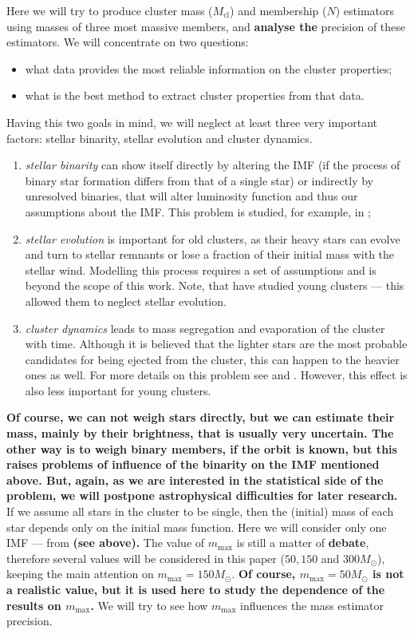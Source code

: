 \documentclass{aastex}
\newcommand{\MSun}{M_\odot}
\newcommand{\Mmax}{m_{\mathrm{max}}}
\newcommand{\Mcl}{M_{\mathrm{cl}}}
\begin{document}
Here we will try to produce cluster mass ($\Mcl$) and membership ($N$) estimators using masses of three most massive members,
and \textbf{analyse the} precision of these estimators. We will concentrate on two questions: 
\begin{itemize}
 \item what data provides the most reliable information on the cluster properties;
 \item what is the best method to extract cluster properties from that data.
\end{itemize}

Having this two goals in mind, we will neglect at least three very important factors: stellar binarity, stellar evolution and cluster dynamics.
\begin{enumerate}
 \item \textit{stellar binarity} can show itself directly by altering the IMF (if the process of binary star formation differs from that of a single star) or indirectly by unresolved binaries, that will alter luminosity function and thus our assumptions about the IMF. 
This problem is studied, for example, in \citet{WKM2008};
 \item \textit{stellar evolution} is important for old clusters, as their heavy stars can evolve and turn to stellar remnants or lose a fraction of their initial mass with the stellar wind. Modelling this process requires a set of assumptions and is beyond the scope of this work. Note, that \citet{Kroupa2010} have studied young clusters --- this allowed them to neglect stellar evolution.
 \item \textit{cluster dynamics} leads to mass segregation and evaporation of the cluster with time. Although it is believed that the lighter
stars are the most probable candidates for being ejected from the cluster, this can happen to the heavier ones as well. For more 
details on this problem see \citet{Pflamm} and \citet{Fleck}. However, this effect is also less important for young clusters.
\end{enumerate}
\textbf{
Of course, we can not weigh stars directly, but we can estimate their mass, mainly by their brightness, that is usually very uncertain. The other way is to weigh binary members, if the orbit is known, but this raises problems of influence of the binarity
on the IMF mentioned above. But, again, as we are interested in the statistical side of the problem, we will postpone astrophysical
difficulties for later research. 
}
If we assume all stars in the cluster to be single, then the (initial) mass of each star depends only on 
the initial mass function. Here we will consider only one IMF --- from \citet{Kroupa2001} \textbf{(see above).} 
The value of $\Mmax$ is still a matter of \textbf{debate}, therefore several values will be considered in this paper ($50, 150$ and $300 \MSun$), keeping the main attention on $\Mmax = 150 \MSun$. \textbf{Of course, $\Mmax = 50 \MSun$ is not a realistic value, but it is used here
to study the dependence of the results on $\Mmax$.} We will try to see how $\Mmax$ influences the mass estimator precision.
\end{document}
